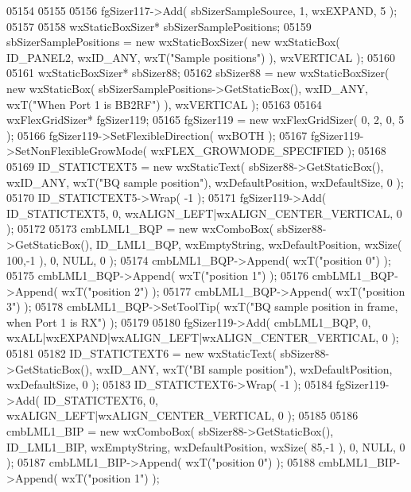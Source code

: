 \begin{DoxyCode}
05154     
05155     
05156     fgSizer117->Add( sbSizerSampleSource, 1, wxEXPAND, 5 );
05157     
05158     wxStaticBoxSizer* sbSizerSamplePositions;
05159     sbSizerSamplePositions = \textcolor{keyword}{new} wxStaticBoxSizer( \textcolor{keyword}{new} wxStaticBox( ID_PANEL2, wxID\_ANY, wxT(\textcolor{stringliteral}{"Sample
       positions"}) ), wxVERTICAL );
05160     
05161     wxStaticBoxSizer* sbSizer88;
05162     sbSizer88 = \textcolor{keyword}{new} wxStaticBoxSizer( \textcolor{keyword}{new} wxStaticBox( sbSizerSamplePositions->GetStaticBox(), wxID\_ANY, 
      wxT(\textcolor{stringliteral}{"When Port 1 is BB2RF"}) ), wxVERTICAL );
05163     
05164     wxFlexGridSizer* fgSizer119;
05165     fgSizer119 = \textcolor{keyword}{new} wxFlexGridSizer( 0, 2, 0, 5 );
05166     fgSizer119->SetFlexibleDirection( wxBOTH );
05167     fgSizer119->SetNonFlexibleGrowMode( wxFLEX\_GROWMODE\_SPECIFIED );
05168     
05169     ID_STATICTEXT5 = \textcolor{keyword}{new} wxStaticText( sbSizer88->GetStaticBox(), wxID\_ANY, wxT(\textcolor{stringliteral}{"BQ sample position"}), 
      wxDefaultPosition, wxDefaultSize, 0 );
05170     ID_STATICTEXT5->Wrap( -1 );
05171     fgSizer119->Add( ID_STATICTEXT5, 0, wxALIGN\_LEFT|wxALIGN\_CENTER\_VERTICAL, 0 );
05172     
05173     cmbLML1_BQP = \textcolor{keyword}{new} wxComboBox( sbSizer88->GetStaticBox(), ID_LML1_BQP, wxEmptyString, wxDefaultPosition,
       wxSize( 100,-1 ), 0, NULL, 0 );
05174     cmbLML1_BQP->Append( wxT(\textcolor{stringliteral}{"position 0"}) );
05175     cmbLML1_BQP->Append( wxT(\textcolor{stringliteral}{"position 1"}) );
05176     cmbLML1_BQP->Append( wxT(\textcolor{stringliteral}{"position 2"}) );
05177     cmbLML1_BQP->Append( wxT(\textcolor{stringliteral}{"position 3"}) );
05178     cmbLML1_BQP->SetToolTip( wxT(\textcolor{stringliteral}{"BQ sample position in frame, when Port 1 is RX"}) );
05179     
05180     fgSizer119->Add( cmbLML1_BQP, 0, wxALL|wxEXPAND|wxALIGN\_LEFT|wxALIGN\_CENTER\_VERTICAL, 0 );
05181     
05182     ID_STATICTEXT6 = \textcolor{keyword}{new} wxStaticText( sbSizer88->GetStaticBox(), wxID\_ANY, wxT(\textcolor{stringliteral}{"BI sample position"}), 
      wxDefaultPosition, wxDefaultSize, 0 );
05183     ID_STATICTEXT6->Wrap( -1 );
05184     fgSizer119->Add( ID_STATICTEXT6, 0, wxALIGN\_LEFT|wxALIGN\_CENTER\_VERTICAL, 0 );
05185     
05186     cmbLML1_BIP = \textcolor{keyword}{new} wxComboBox( sbSizer88->GetStaticBox(), ID_LML1_BIP, wxEmptyString, wxDefaultPosition,
       wxSize( 85,-1 ), 0, NULL, 0 );
05187     cmbLML1_BIP->Append( wxT(\textcolor{stringliteral}{"position 0"}) );
05188     cmbLML1_BIP->Append( wxT(\textcolor{stringliteral}{"position 1"}) );

\end{DoxyCode}
